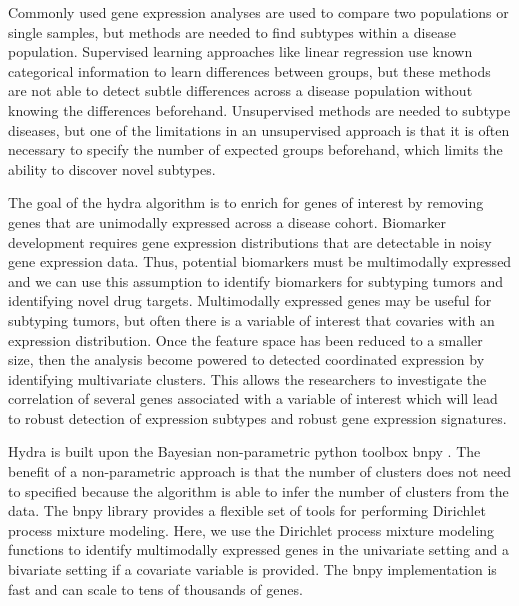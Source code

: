 \documentclass[fleqn,10pt]{wlscirep}
\begin{document}

Commonly used gene expression analyses are used to compare two populations or single samples, but methods are needed to find subtypes within a disease population. Supervised learning approaches like linear regression use known categorical information to learn differences between groups, but these methods are not able to detect subtle differences across a disease population without knowing the differences beforehand. Unsupervised methods are needed to subtype diseases, but one of the limitations in an unsupervised approach is that it is often necessary to specify the number of expected groups beforehand, which limits the ability to discover novel subtypes.

The goal of the hydra algorithm is to enrich for genes of interest by removing genes that are unimodally expressed across a disease cohort. Biomarker development requires gene expression distributions that are detectable in noisy gene expression data. Thus, potential biomarkers must be multimodally expressed and we can use this assumption to identify biomarkers for subtyping tumors and identifying novel drug targets. Multimodally expressed genes may be useful for subtyping tumors, but often there is a variable of interest that covaries with an expression distribution. Once the feature space has been reduced to a smaller size, then the analysis become powered to detected coordinated expression by identifying multivariate clusters. This allows the researchers to investigate the correlation of several genes associated with a variable of interest which will lead to robust detection of expression subtypes and robust gene expression signatures.

Hydra is built upon the Bayesian non-parametric python toolbox bnpy \cite{hughes2014bnpy}. The benefit of a non-parametric approach is that the number of clusters does not need to specified because the algorithm is able to infer the number of clusters from the data. The bnpy library provides a flexible set of tools for performing Dirichlet process mixture modeling. Here, we use the Dirichlet process mixture modeling functions to identify multimodally expressed genes in the univariate setting and a bivariate setting if a covariate variable is provided. The bnpy implementation is fast and can scale to tens of thousands of genes.
\end{document}
